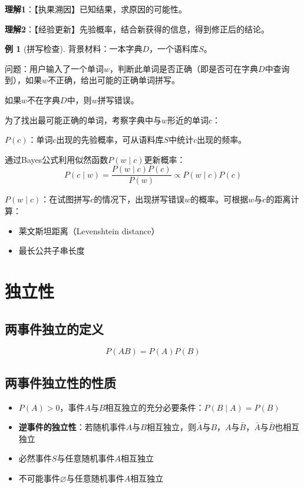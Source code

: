\documentclass[11pt,a4paper]{report}
\theoremstyle{definition}
\newtheorem{example}{例}[chapter]
\theoremstyle{plain}
\begin{document}
\textbf{理解1}：【执果溯因】已知结果，求原因的可能性。

\textbf{理解2}：【经验更新】先验概率，结合新获得的信息，得到修正后的结论。

\begin{example}[拼写检查]
背景材料：一本字典$D$，一个语料库$S$。

问题：用户输入了一个单词$w$，判断此单词是否正确（即是否可在字典$D$中查询到），如果$w$不正确，给出可能的正确单词拼写。

如果$w$不在字典$D$中，则$w$拼写错误。

为了找出最可能正确的单词，考察字典中与$w$形近的单词$c$：

$P(c)$：单词$c$出现的先验概率，可从语料库$S$中统计$c$出现的频率。

通过Bayes公式利用似然函数$P(w\mid c)$更新概率：
\[
P(c\mid w)=\frac{P(w\mid c)P(c)}{P(w)}\propto P(w\mid c)P(c)
\]

$P(w\mid c)$：在试图拼写$c$的情况下，出现拼写错误$w$的概率。可根据$w$与$c$的距离计算：
\begin{itemize}[leftmargin=2em]
    \item 莱文斯坦距离（Levenshtein distance）
    \item 最长公共子串长度
\end{itemize}
\end{example}

\section{独立性}

\subsection{两事件独立的定义}

\[
P(AB)=P(A)P(B)
\]

\subsection{两事件独立性的性质}

\begin{itemize}[leftmargin=2em]
    \item $P(A)>0$，事件$A$与$B$相互独立的充分必要条件：$P(B\mid A)=P(B)$
    \item \textbf{逆事件的独立性}：若随机事件$A$与$B$相互独立，则$\bar{A}$与$B$，$A$与$\bar{B}$，$\bar{A}$与$\bar{B}$也相互独立
    \item 必然事件$S$与任意随机事件$A$相互独立
    \item 不可能事件$\varnothing$与任意随机事件$A$相互独立
\end{itemize}
\end{document}
